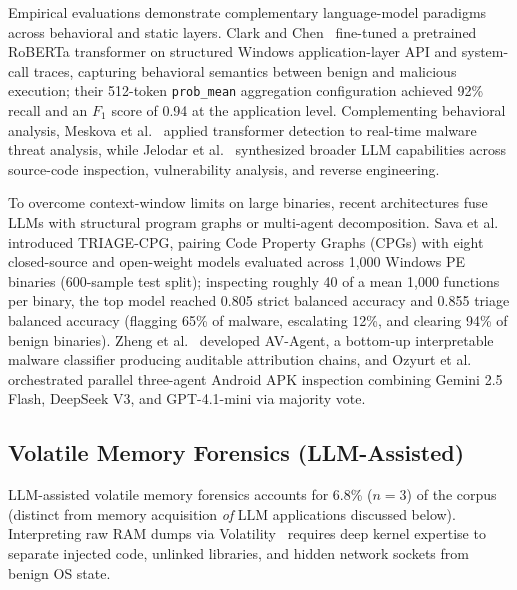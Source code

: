 Empirical evaluations demonstrate complementary language-model paradigms across behavioral and static layers. Clark and Chen~\cite{clark2025_large} fine-tuned a pretrained RoBERTa transformer on structured Windows application-layer API and system-call traces, capturing behavioral semantics between benign and malicious execution; their 512-token \texttt{prob\_mean} aggregation configuration achieved 92\% recall and an $F_1$ score of 0.94 at the application level. Complementing behavioral analysis, Meskova et al.~\cite{meskova2026_aidriven} applied transformer detection to real-time malware threat analysis, while Jelodar et al.~\cite{jelodar2026_large} synthesized broader LLM capabilities across source-code inspection, vulnerability analysis, and reverse engineering.

To overcome context-window limits on large binaries, recent architectures fuse LLMs with structural program graphs or multi-agent decomposition. Sava et al.~\cite{sava2026_triagecpg} introduced TRIAGE-CPG, pairing Code Property Graphs (CPGs) with eight closed-source and open-weight models evaluated across 1,000 Windows PE binaries (600-sample test split); inspecting roughly 40 of a mean 1,000 functions per binary, the top model reached 0.805 strict balanced accuracy and 0.855 triage balanced accuracy (flagging 65\% of malware, escalating 12\%, and clearing 94\% of benign binaries). Zheng et al.~\cite{zheng2025_avagent} developed AV-Agent, a bottom-up interpretable malware classifier producing auditable attribution chains, and Ozyurt et al.~\cite{ozyurt2026_llmorchestrated} orchestrated parallel three-agent Android APK inspection combining Gemini 2.5 Flash, DeepSeek V3, and GPT-4.1-mini via majority vote.

\subsection{Volatile Memory Forensics (LLM-Assisted)}
LLM-assisted volatile memory forensics accounts for 6.8\% ($n=3$) of the corpus (distinct from memory acquisition \textit{of} LLM applications discussed below). Interpreting raw RAM dumps via Volatility~\cite{case2014volatility} requires deep kernel expertise to separate injected code, unlinked libraries, and hidden network sockets from benign OS state.

